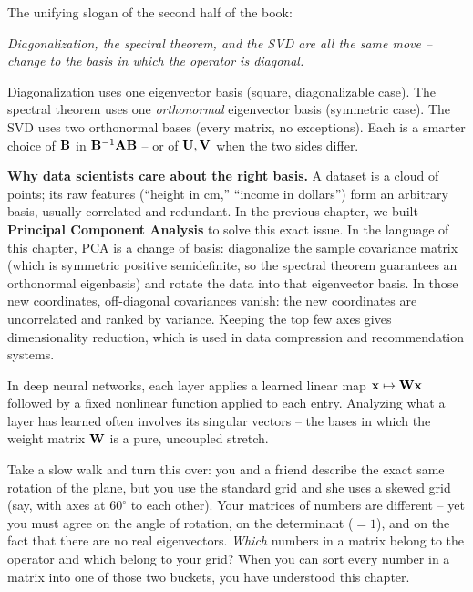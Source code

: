 \begin{focusbox}
The unifying slogan of the second half of the book:
\begin{center}
\emph{Diagonalization, the spectral theorem, and the SVD are all the same move --
change to the basis in which the operator is diagonal.}
\end{center}
Diagonalization uses one eigenvector basis (square, diagonalizable case). The
spectral theorem uses one \emph{orthonormal} eigenvector basis (symmetric case).
The SVD uses two orthonormal bases (every matrix, no exceptions). Each is a smarter
choice of $\mathbf{B}$ in $\mathbf{B}^{-1}\mathbf{A}\mathbf{B}$ -- or of $\mathbf{U},\mathbf{V}$ when
the two sides differ.
\end{focusbox}

\begin{applicationbox}
\textbf{Why data scientists care about the right basis.} A dataset is a cloud of
points; its raw features (``height in cm,'' ``income in dollars'') form an
arbitrary basis, usually correlated and redundant. In the previous chapter, we built
\textbf{Principal Component Analysis} to solve this exact issue. In the language of this chapter,
PCA is a change of basis: diagonalize the sample
covariance matrix (which is symmetric positive semidefinite, so the spectral
theorem guarantees an orthonormal eigenbasis) and rotate the data into that
eigenvector basis. In those new coordinates, off-diagonal covariances vanish: the
new coordinates are uncorrelated and ranked by variance. Keeping the top few axes
gives dimensionality reduction, which is used in data compression and
recommendation systems.

In deep neural networks, each layer applies a learned linear map
$\mathbf{x}\mapsto\mathbf{W}\mathbf{x}$ followed by a fixed nonlinear function applied to
each entry. Analyzing what a layer has learned often involves its singular
vectors -- the bases in which the weight matrix $\mathbf{W}$ is a pure, uncoupled stretch.
\end{applicationbox}

\begin{walkbox}
Take a slow walk and turn this over: you and a friend describe the exact same
rotation of the plane, but you use the standard grid and she uses a skewed grid (say, with axes at $60^\circ$ to each other). Your matrices of numbers are different -- yet you must agree on the
angle of rotation, on the determinant ($=1$), and on the fact that there are no
real eigenvectors. \emph{Which} numbers in a matrix belong to the operator and
which belong to your grid? When you can sort every number in a matrix into one of
those two buckets, you have understood this chapter.
\end{walkbox}

